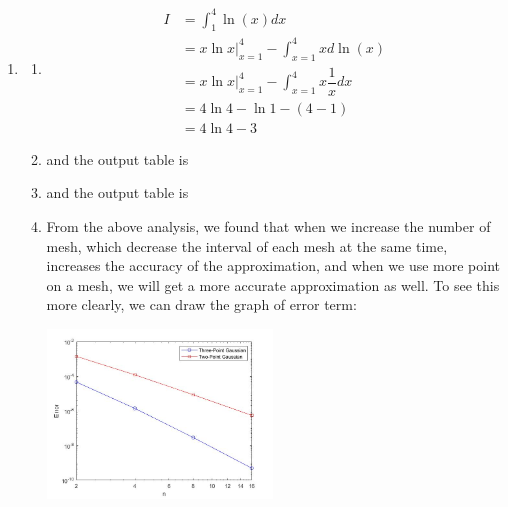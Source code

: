 \documentclass{article}
\begin{document}



\begin{enumerate}
\item
\begin{enumerate}
\item
\begin{align*}
I&=\int_1^4 \ln (x) dx\\
&= x \ln x| _{x=1}^4 - \int_{x=1}^4 x d\ln(x)\\
&= x \ln x |_{x=1}^4 -\int_{x=1}^4 x \dfrac{1}{x} dx\\
&=4\ln 4-\ln 1 -(4-1)\\
&=4\ln 4 -3
\end{align*}
\item

 
 
 and the output table is \begin{small}
 
 \end{small}
 
 \item
 
  
 
 and the output table is \begin{small}
 
 \end{small}
 \item
From the above analysis, we found that when we increase the number of mesh, which decrease the interval of each mesh at the same time, increases the accuracy of the approximation, and when we use more point on a mesh, we will get a more accurate approximation as well. To see this more clearly, we can draw the graph of error term:  \begin{center}
  \includegraphics[width=6cm]{error_analysis_Gaussian.jpg} 
 \end{center}
 

\end{enumerate}
\end{enumerate}
\end{document}
